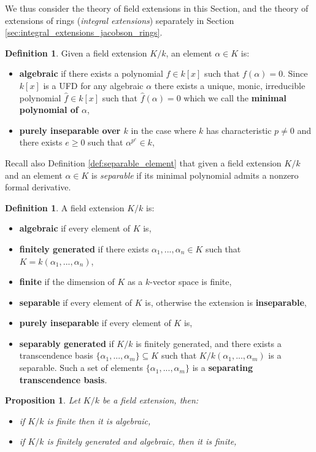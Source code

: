 \documentclass[12pt]{article}
\theoremstyle{plain}
\newtheorem{proposition}[thm]{Proposition}
\theoremstyle{definition}
\newtheorem{defn}[thm]{Definition} %
\begin{document}
	We thus consider the theory of field extensions in this Section, and the theory of extensions of rings (\emph{integral extensions}) separately in Section \ref{sec:integral_extensions_jacobson_rings}.
	\begin{defn}
		Given a field extension $K/k$, an element $\alpha \in K$ is:
		\begin{itemize}
			\item \textbf{algebraic} if there exists a polynomial $f \in k[x]$ such that $f(\alpha) = 0$. Since $k[x]$ is a UFD for any algebraic $\alpha$ there exists a unique, monic, irreducible polynomial $\hat{f} \in k[x]$ such that $\hat{f}(\alpha) = 0$ which we call the \textbf{minimal polynomial of $\alpha$},
			\item \textbf{purely inseparable over $k$} in the case where $k$ has characteristic $p \neq 0$ and there exists $e \geq 0$ such that $\alpha^{p^e} \in k$,
		\end{itemize}
	\end{defn}
	Recall also Definition \ref{def:separable_element} that given a field extension $K/k$ and an element $\alpha \in K$ is \emph{separable} if its minimal polynomial admits a nonzero formal derivative.
	\begin{defn}
		A field extension $K/k$ is:
		\begin{itemize}
			\item \textbf{algebraic} if every element of $K$ is,
			\item \textbf{finitely generated} if there exists $\alpha_1,...,\alpha_n \in K$ such that $K = k(\alpha_1,...,\alpha_n)$,
			\item \textbf{finite} if the dimension of $K$ as a $k$-vector space is finite,
			\item \textbf{separable} if every element of $K$ is, otherwise the extension is \textbf{inseparable},
			\item \textbf{purely inseparable} if every element of $K$ is,
			\item \textbf{separably generated} if $K/k$ is finitely generated, and there exists a transcendence basis $\lbrace \alpha_1,...,\alpha_m\rbrace \subseteq K$ such that $K/k(\alpha_1,...,\alpha_m)$ is a separable. Such a set of elements $\lbrace \alpha_1,...,\alpha_m\rbrace$ is a \textbf{separating transcendence basis}.
		\end{itemize}
	\end{defn}
	\begin{proposition}\label{prop:extension_relations}
		Let $K/k$ be a field extension, then:
		\begin{itemize}
			\item if $K/k$ is finite then it is algebraic,
			\item if $K/k$ is finitely generated and algebraic, then it is finite,
		\end{itemize}
	\end{proposition}
\end{document}
